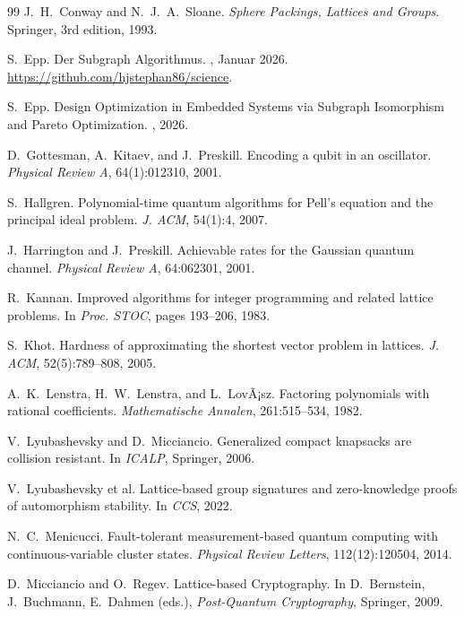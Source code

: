 ﻿\documentclass[a4paper,12pt]{article}
\theoremstyle{definition}
\begin{document}
\begin{thebibliography}{99}
J.~H.~Conway and N.~J.~A.~Sloane.
\newblock \textit{Sphere Packings, Lattices and Groups}.
\newblock Springer, 3rd edition, 1993.

S.~Epp.
\newblock Der Subgraph Algorithmus.
\newblock, Januar 2026.
\newblock \url{https://github.com/hjstephan86/science}.

S.~Epp.
\newblock Design Optimization in Embedded Systems via Subgraph Isomorphism
  and Pareto Optimization.
\newblock, 2026.

D.~Gottesman, A.~Kitaev, and J.~Preskill.
\newblock Encoding a qubit in an oscillator.
\newblock \textit{Physical Review A}, 64(1):012310, 2001.

S.~Hallgren.
\newblock Polynomial-time quantum algorithms for Pell's equation and the
  principal ideal problem.
\newblock \textit{J. ACM}, 54(1):4, 2007.

J.~Harrington and J.~Preskill.
\newblock Achievable rates for the Gaussian quantum channel.
\newblock \textit{Physical Review A}, 64:062301, 2001.

R.~Kannan.
\newblock Improved algorithms for integer programming and related lattice
  problems.
\newblock In \textit{Proc. STOC}, pages 193--206, 1983.

S.~Khot.
\newblock Hardness of approximating the shortest vector problem in lattices.
\newblock \textit{J. ACM}, 52(5):789--808, 2005.

A.~K.~Lenstra, H.~W.~Lenstra, and L.~LovÃ¡sz.
\newblock Factoring polynomials with rational coefficients.
\newblock \textit{Mathematische Annalen}, 261:515--534, 1982.

V.~Lyubashevsky and D.~Micciancio.
\newblock Generalized compact knapsacks are collision resistant.
\newblock In \textit{ICALP}, Springer, 2006.

V.~Lyubashevsky et al.
\newblock Lattice-based group signatures and zero-knowledge proofs of
  automorphism stability.
\newblock In \textit{CCS}, 2022.

N.~C.~Menicucci.
\newblock Fault-tolerant measurement-based quantum computing with
  continuous-variable cluster states.
\newblock \textit{Physical Review Letters}, 112(12):120504, 2014.

D.~Micciancio and O.~Regev.
\newblock Lattice-based Cryptography.
\newblock In D.~Bernstein, J.~Buchmann, E.~Dahmen (eds.), \textit{Post-Quantum
  Cryptography}, Springer, 2009.


\end{thebibliography}
\end{document}
